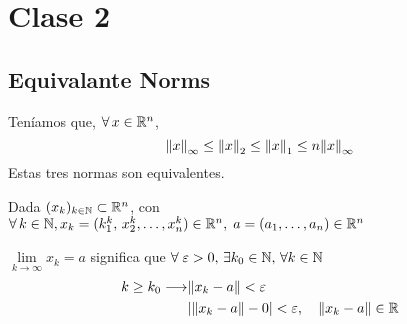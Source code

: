 \chapter{Clase 2}

\section{Equivalante Norms}
Teníamos que, $\forall\, x \in \mathbb{R}^{n}$,
$$
\norm{x}_{\infty} \leq \norm{x}_2 \leq \norm{x}_1 \leq n \norm{x}_{\infty}
$$
Estas tres normas son equivalentes.

Dada $(x_k)_{k \in \mathbb{N}} \subset \mathbb{R}^{n}$, con $\forall \, k\in \mathbb{N}, x_k = (k_1^k, \, x_2^k, \ldots, x_n^k) \in \mathbb{R}^{n}, \; a = (a_1, \ldots ,a_n)\in \mathbb{R}^{n}$

$
\lim\limits_{k \to \infty} x_k = a $ significa que $\forall\; \varepsilon>0,\, \exists k_0 \in \mathbb{N}, \, \forall k \in \mathbb{N}
$
\begin{align*}
	k \geq k_0 \longrightarrow &\norm{x_k-a} < \varepsilon\\
	& \abs{ \norm{x_k-a}-0} < \varepsilon,  \quad \norm{x_k-a} \in \mathbb{R} 
\end{align*}


